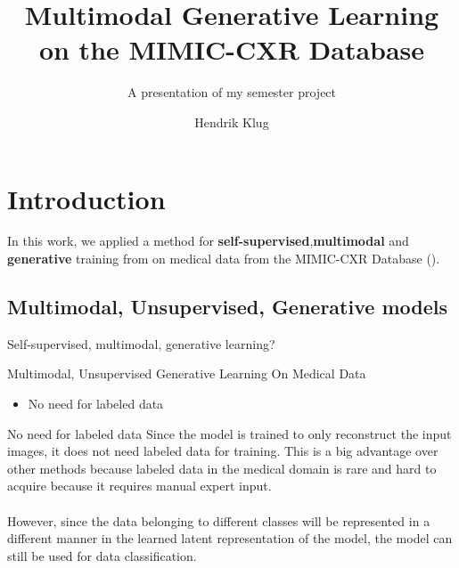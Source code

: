 

\title{Multimodal Generative Learning on the MIMIC-CXR Database}
\subtitle{A presentation of my semester project}
\author{Hendrik Klug}

    \begin{frame}
        \titlepage
    \end{frame}


    \section{Introduction}

    \begin{frame}
        In this work, we applied a method for \textbf{self-supervised},\textbf{multimodal} and \textbf{generative} training from \cite{thomas_multimodal} on medical data from the MIMIC-CXR Database (\cite{johnson2019mimic}).
    \end{frame}

    \subsection{Multimodal, Unsupervised, Generative models}
    \begin{frame}{Self-supervised, multimodal, generative learning?}
    \end{frame}

    \begin{frame}{Multimodal, Unsupervised Generative Learning On Medical Data}
        \begin{itemize}
            \item No need for labeled data
        \end{itemize}
    \end{frame}
    
    \begin{frame}{No need for labeled data}
    Since the model is trained to only reconstruct the input images, it does not need labeled data for training.
    This is a big advantage over other methods because labeled data in the medical domain is rare and hard to acquire because it requires manual expert input.\\
    \\
    \pause
    However, since the data belonging to different classes will be represented in a different manner in the learned latent representation of the model, the model can still be used for data classification.
    \end{frame}
    
